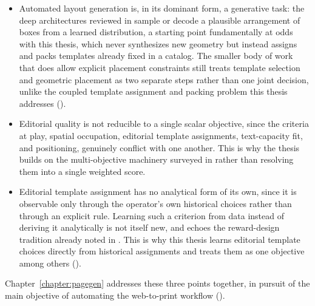 \begin{itemize}
    \item Automated layout generation is, in its dominant form, a generative task: the deep architectures reviewed in  sample or decode a plausible arrangement of boxes from a learned distribution, a starting point fundamentally at odds with this thesis, which never synthesizes new geometry but instead assigns and packs templates already fixed in a catalog. The smaller body of work that does allow explicit placement constraints still treats template selection and geometric placement as two separate steps rather than one joint decision, unlike the coupled template assignment and packing problem this thesis addresses ().
    \item Editorial quality is not reducible to a single scalar objective, since the criteria at play, spatial occupation, editorial template assignments, text-capacity fit, and positioning, genuinely conflict with one another. This is why the thesis builds on the multi-objective machinery surveyed in  rather than resolving them into a single weighted score.
    \item Editorial template assignment has no analytical form of its own, since it is observable only through the operator's own historical choices rather than through an explicit rule. Learning such a criterion from data instead of deriving it analytically is not itself new, and echoes the reward-design tradition already noted in . This is why this thesis  learns editorial template choices directly from historical assignments and treats them as one objective among others ().
\end{itemize}

Chapter~\ref{chapter:pagegen} addresses these three points together, in pursuit of the main objective of automating the web-to-print workflow ().
